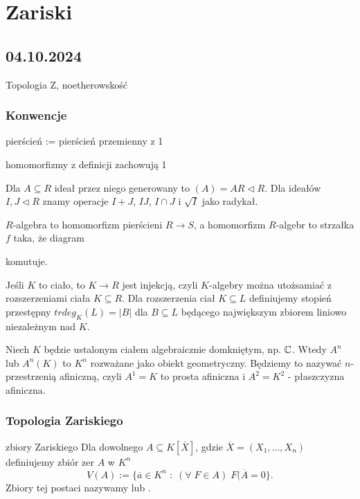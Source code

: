 \chapter{Zariski}

\section{04.10.2024}{Topologia Z, noetherowskość}

\subsection{Konwencje}

pierścień := pierścień przemienny z 1

homomorfizmy z definicji zachowują 1

Dla $A\subseteq R$ ideał przez niego generowany to $(A)=AR\triangleleft R$. Dla ideałów $I,J\triangleleft R$ znamy operacje $I+J$, $IJ$, $I\cap J$ i $\sqrt{I}$ jako radykał.

$R$-algebra to homomorfizm pierścieni $R\to S$, a homomorfizm $R$-algebr to strzałka $f$ taka, że diagram
\begin{center}
\end{center}
komutuje.

Jeśli $K$ to ciało, to $K\to R$ jest injekcją, czyli $K$-algebry można utożsamiać z rozszerzeniami ciała $K\subseteq R$. Dla rozszerzenia ciał $K\subseteq L$ definiujemy stopień przestępny $trdeg_K(L)=|B|$ dla $B\subseteq L$ będącego największym zbiorem liniowo niezależnym nad $K$.

Niech $K$ będzie ustalonym ciałem algebraicznie domkniętym, np. $\mathbb{C}$. Wtedy $A^n$ lub $A^n(K)$ to $K^n$ rozważane jako obiekt geometryczny. Będziemy to nazywać $n$-przestrzenią afiniczną, czyli $A^1=K$ to prosta afiniczna i $A^2=K^2$ - płaszczyzna afiniczna.

\subsection{Topologia Zariskiego}

\begin{definition}{zbiory Zariskiego}{}
  Dla dowolnego $A\subseteq K[\overline{X}]$, gdzie $\overline{X}=(X_1,..., X_n)$ definiujemy zbiór zer $A$ w $K^n$
  $$V(A):=\{\overline{a}\in K^n\;:\;(\forall\;F\in A)\;F(\overline{A}=0\}.$$
  Zbiory tej postaci nazywamy  lub .
\end{definition}

